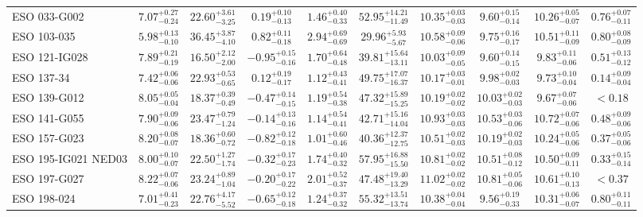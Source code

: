\documentclass[onecolumn]{mn2e}
\begin{document}
\begin{landscape}
{\begin{center}
\begin{longtable}{lccccccccc}
ESO 033-G002 & $7.07_{-0.24}^{+0.27}$ & $22.60_{-3.25}^{+3.61}$ & $0.19_{-0.13}^{+0.10}$ & $1.46_{-0.33}^{+0.40}$ &$52.95_{-11.49}^{+14.21}$ & $10.35_{-0.03}^{+0.03}$ & $9.60_{-0.14}^{+0.15}$ & $10.26_{-0.07}^{+0.05}$ & $0.76_{-0.11}^{+0.07}$ \\
ESO 103-035 & $5.98_{-0.10}^{+0.13}$ & $36.45_{-4.10}^{+3.87}$ & $0.82_{-0.18}^{+0.11}$ & $2.94_{-0.69}^{+0.69}$ &$29.96_{-5.67}^{+5.93}$ & $10.58_{-0.06}^{+0.09}$ & $9.75_{-0.17}^{+0.16}$ & $10.51_{-0.09}^{+0.11}$ & $0.80_{-0.09}^{+0.08}$ \\
ESO 121-IG028 & $7.89_{-0.19}^{+0.21}$ & $16.50_{-2.00}^{+2.12}$ & $-0.95_{-0.16}^{+0.15}$ & $1.70_{-0.48}^{+0.64}$ &$39.81_{-13.11}^{+15.64}$ & $10.03_{-0.05}^{+0.09}$ & $9.60_{-0.15}^{+0.14}$ & $9.83_{-0.06}^{+0.11}$ & $0.51_{-0.12}^{+0.13}$ \\
ESO 137-34 & $7.42_{-0.06}^{+0.06}$ & $22.93_{-0.65}^{+0.53}$ & $0.12_{-0.17}^{+0.19}$ & $1.12_{-0.41}^{+0.43}$ &$49.75_{-16.37}^{+17.07}$ & $10.17_{-0.01}^{+0.03}$ & $9.98_{-0.03}^{+0.02}$ & $9.73_{-0.04}^{+0.10}$ & $0.14_{-0.04}^{+0.09}$ \\
ESO 139-G012 & $8.05_{-0.04}^{+0.05}$ & $18.37_{-0.49}^{+0.39}$ & $-0.47_{-0.15}^{+0.14}$ & $1.19_{-0.38}^{+0.54}$ &$47.32_{-15.25}^{+15.89}$ & $10.19_{-0.02}^{+0.02}$ & $10.03_{-0.03}^{+0.02}$ & $9.67_{-0.06}^{+0.07}$ & $<0.18$ \\
ESO 141-G055 & $7.90_{-0.06}^{+0.09}$ & $23.47_{-1.24}^{+0.79}$ & $-0.14_{-0.16}^{+0.13}$ & $1.14_{-0.41}^{+0.54}$ &$42.71_{-14.04}^{+15.16}$ & $10.93_{-0.03}^{+0.03}$ & $10.53_{-0.06}^{+0.03}$ & $10.72_{-0.06}^{+0.07}$ & $0.48_{-0.06}^{+0.09}$ \\
ESO 157-G023 & $8.20_{-0.07}^{+0.08}$ & $18.36_{-0.72}^{+0.60}$ & $-0.82_{-0.18}^{+0.12}$ & $1.01_{-0.46}^{+0.60}$ &$40.36_{-12.75}^{+12.37}$ & $10.51_{-0.03}^{+0.02}$ & $10.19_{-0.03}^{+0.02}$ & $10.24_{-0.06}^{+0.05}$ & $0.37_{-0.06}^{+0.05}$ \\
ESO 195-IG021 NED03 & $8.00_{-0.07}^{+0.10}$ & $22.50_{-1.74}^{+1.27}$ & $-0.32_{-0.23}^{+0.17}$ & $1.74_{-0.32}^{+0.40}$ &$57.95_{-15.50}^{+16.88}$ & $10.81_{-0.02}^{+0.02}$ & $10.51_{-0.12}^{+0.08}$ & $10.50_{-0.11}^{+0.09}$ & $0.33_{-0.14}^{+0.15}$ \\
ESO 197-G027 & $8.22_{-0.06}^{+0.07}$ & $23.24_{-1.04}^{+0.89}$ & $-0.20_{-0.22}^{+0.17}$ & $2.01_{-0.37}^{+0.52}$ &$47.48_{-13.29}^{+19.40}$ & $11.02_{-0.02}^{+0.02}$ & $10.81_{-0.06}^{+0.05}$ & $10.61_{-0.13}^{+0.10}$ & $<0.37$ \\
ESO 198-024 & $7.01_{-0.23}^{+0.41}$ & $22.76_{-5.52}^{+4.17}$ & $-0.65_{-0.18}^{+0.12}$ & $1.24_{-0.32}^{+0.37}$ &$55.32_{-13.74}^{+13.51}$ & $10.38_{-0.04}^{+0.04}$ & $9.56_{-0.33}^{+0.19}$ & $10.31_{-0.07}^{+0.06}$ & $0.80_{-0.11}^{+0.11}$ \\

\end{longtable}
\end{center}}
\end{landscape}
\end{document}
